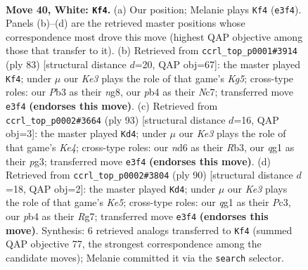 \documentclass[11pt]{article}
\begin{document}
\clearpage

\begin{figure}[p]\centering
\begin{subfigure}{0.46\textwidth}\centering
\resizebox{\linewidth}{!}{%
\newchessgame
\chessboard[
  setfen={3k4/4b3/3n4/8/1p6/1P2K3/8/6q1 w - - 0 40},
  showmover=false,
  pgfstyle=straightmove, color=movearrow, markmove={e3-f4}
]}
\caption{}
\end{subfigure}\hfill
\begin{subfigure}{0.46\textwidth}\centering
\resizebox{\linewidth}{!}{%
\newchessgame
\chessboard[
  setfen={6N1/1bn5/8/7p/6k1/8/4B3/5K2 b - - 1 42},
  showmover=false,
  pgfstyle=straightmove, color=movearrow, markmove={g4-f4}
]}
\caption{}
\end{subfigure}
\\[4pt]
\begin{subfigure}{0.46\textwidth}\centering
\resizebox{\linewidth}{!}{%
\newchessgame
\chessboard[
  setfen={8/7p/8/4k3/8/1r3BP1/4K3/8 b - - 2 47},
  showmover=false,
  pgfstyle=straightmove, color=movearrow, markmove={e5-d4}
]}
\caption{}
\end{subfigure}\hfill
\begin{subfigure}{0.46\textwidth}\centering
\resizebox{\linewidth}{!}{%
\newchessgame
\chessboard[
  setfen={8/3b2R1/1pk5/4K3/8/2P5/8/8 w - - 2 46},
  showmover=false,
  pgfstyle=straightmove, color=movearrow, markmove={e5-d4}
]}
\caption{}
\end{subfigure}
\caption{\textbf{Move 40, White: \texttt{Kf4}.} (a) Our position; Melanie plays \texttt{Kf4} (\texttt{e3f4}). Panels (b)--(d) are the retrieved master positions whose correspondence most drove this move (highest QAP objective among those that transfer to it). (b) Retrieved from \texttt{ccrl\_top\_p0001\#3914} (ply 83) [structural distance $d$=20, QAP obj=67]: the master played \texttt{Kf4}; under $\mu$ our \emph{Ke3} plays the role of that game's \emph{Kg5}; cross-type roles: our \emph{P}b3 as their \emph{n}g8, our \emph{p}b4 as their \emph{N}c7; transferred move \texttt{e3f4} \textbf{(endorses this move)}. (c) Retrieved from \texttt{ccrl\_top\_p0002\#3664} (ply 93) [structural distance $d$=16, QAP obj=3]: the master played \texttt{Kd4}; under $\mu$ our \emph{Ke3} plays the role of that game's \emph{Ke4}; cross-type roles: our \emph{n}d6 as their \emph{R}b3, our \emph{q}g1 as their \emph{p}g3; transferred move \texttt{e3f4} \textbf{(endorses this move)}. (d) Retrieved from \texttt{ccrl\_top\_p0002\#3804} (ply 90) [structural distance $d$=18, QAP obj=2]: the master played \texttt{Kd4}; under $\mu$ our \emph{Ke3} plays the role of that game's \emph{Ke5}; cross-type roles: our \emph{q}g1 as their \emph{P}c3, our \emph{p}b4 as their \emph{R}g7; transferred move \texttt{e3f4} \textbf{(endorses this move)}. Synthesis: 6 retrieved analogs transferred to \texttt{Kf4} (summed QAP objective 77, the strongest correspondence among the candidate moves); Melanie committed it via the \texttt{search} selector.}
\label{fig:thought-m78}
\end{figure}
\end{document}
